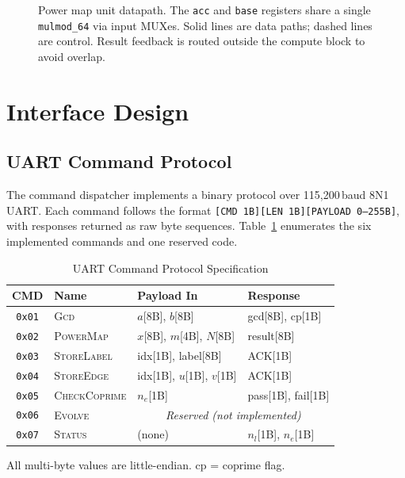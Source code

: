\documentclass[lettersize,journal]{IEEEtran}
\begin{document}
\begin{figure}[!t]
\caption{Power map unit datapath. The \texttt{acc} and \texttt{base} registers share a single \texttt{mulmod\_64} via input MUXes. Solid lines are data paths; dashed lines are control. Result feedback is routed outside the compute block to avoid overlap.}
\label{fig:pm_datapath}
\end{figure}

\section{Interface Design}
\label{sec:interface}

\subsection{UART Command Protocol}

The command dispatcher implements a binary protocol over 115{,}200\,baud 8N1 UART. Each command follows the format \texttt{[CMD~1B][LEN~1B][PAYLOAD~0--255B]}, with responses returned as raw byte sequences. Table~\ref{tab:uart} enumerates the six implemented commands and one reserved code.

\begin{table}[!t]
\caption{UART Command Protocol Specification\label{tab:uart}}
\centering
\begin{tabular}{@{}clll@{}}
\toprule
\textbf{CMD} & \textbf{Name} & \textbf{Payload In} & \textbf{Response} \\
\midrule
\texttt{0x01} & \textsc{Gcd}           & $a$[8B], $b$[8B]       & gcd[8B], cp[1B] \\
\texttt{0x02} & \textsc{PowerMap}      & $x$[8B], $m$[4B], $N$[8B] & result[8B] \\
\texttt{0x03} & \textsc{StoreLabel}    & idx[1B], label[8B]     & ACK[1B] \\
\texttt{0x04} & \textsc{StoreEdge}     & idx[1B], $u$[1B], $v$[1B] & ACK[1B] \\
\texttt{0x05} & \textsc{CheckCoprime}  & $n_e$[1B]              & pass[1B], fail[1B] \\
\texttt{0x06} & \textsc{Evolve}        & \multicolumn{2}{c}{\textit{Reserved (not implemented)}} \\
\texttt{0x07} & \textsc{Status}        & (none)                 & $n_l$[1B], $n_e$[1B] \\
\bottomrule
\end{tabular}
\vspace{0.5em}
\footnotesize All multi-byte values are little-endian. cp = coprime flag.
\end{table}
\end{document}
